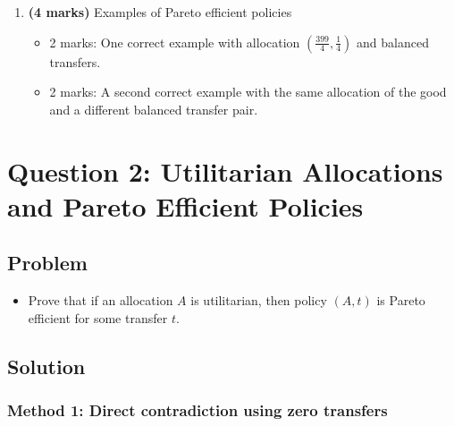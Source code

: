 \documentclass[12pt]{article}
\begin{document}
\begin{enumerate}[label=(\alph*)]
    \item \textbf{(4 marks)} Examples of Pareto efficient policies
    \begin{itemize}
        \item 2 marks: One correct example with allocation \(\left(\frac{399}{4},\frac14\right)\) and balanced transfers.
        \item 2 marks: A second correct example with the same allocation of the good and a different balanced transfer pair.
    \end{itemize}
\end{enumerate}

\newpage
\section{Question 2: Utilitarian Allocations and Pareto Efficient Policies}

\subsection{Problem}
\begin{itemize}
    \item Prove that if an allocation \(A\) is utilitarian, then policy \((A,t)\) is Pareto efficient for some transfer \(t\).
\end{itemize}

\newpage
\subsection{Solution}

\subsubsection{Method 1: Direct contradiction using zero transfers}
\end{document}
